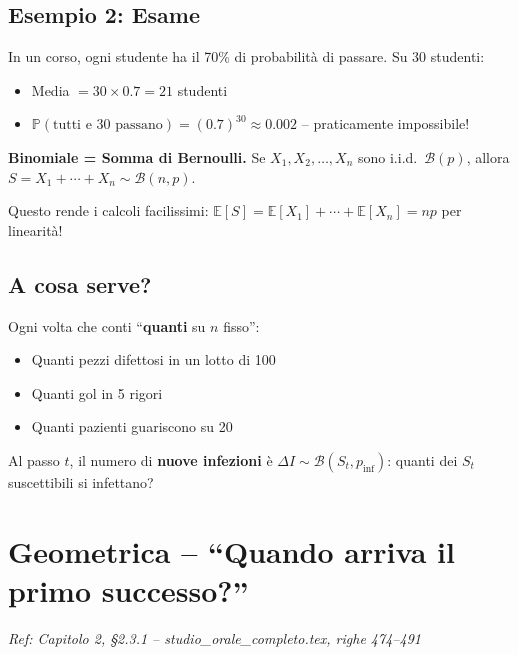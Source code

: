 \documentclass[a4paper,11pt]{article}
\newcommand{\PP}{\mathbb{P}}
\newcommand{\E}{\mathbb{E}}
\begin{document}
\subsection*{Esempio 2: Esame}
In un corso, ogni studente ha il 70\% di probabilità di passare. Su 30 studenti:
\begin{itemize}[nosep]
    \item Media $= 30 \times 0.7 = 21$ studenti
    \item $\PP(\text{tutti e 30 passano}) = (0.7)^{30} \approx 0.002$ -- praticamente impossibile!
\end{itemize}

\begin{tcolorbox}[mybox=orange, title=Il trucco chiave (righe 342--344)]
\textbf{Binomiale = Somma di Bernoulli.} Se $X_1, X_2, \dots, X_n$ sono i.i.d.\ $\mathcal{B}(p)$, allora $S = X_1 + \cdots + X_n \sim \mathcal{B}(n,p)$.

Questo rende i calcoli facilissimi: $\E[S] = \E[X_1] + \cdots + \E[X_n] = np$ per linearità!
\end{tcolorbox}

\subsection*{A cosa serve?}
Ogni volta che conti ``\textbf{quanti} su $n$ fisso'':
\begin{itemize}[nosep]
    \item Quanti pezzi difettosi in un lotto di 100
    \item Quanti gol in 5 rigori
    \item Quanti pazienti guariscono su 20
\end{itemize}

\begin{tcolorbox}[mybox=green, title=Nel modello SIR]
Al passo $t$, il numero di \textbf{nuove infezioni} è $\Delta I \sim \mathcal{B}(S_t, p_{\text{inf}})$: quanti dei $S_t$ suscettibili si infettano?
\end{tcolorbox}

\section{Geometrica -- ``Quando arriva il primo successo?''}
\label{sec:geometrica}

\textit{Ref: Capitolo 2, \S2.3.1 -- studio\_orale\_completo.tex, righe 474--491}
\end{document}
